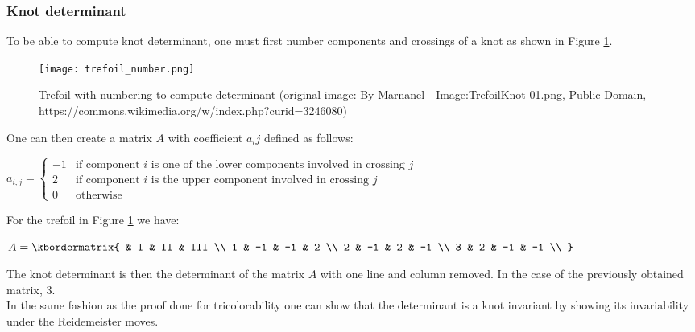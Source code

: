 \documentclass[12pt, a4paper]{article}
\begin{document}
\subsubsection{Knot determinant}
\label{sec:knot_det}

To be able to compute knot determinant, one must first number components and crossings of a knot as shown in Figure \ref{fig:trefoil_number}.

\begin{figure}[H]
  \centering
  \texttt{[image: trefoil\_number.png]}
  \caption{Trefoil with numbering to compute determinant (original image: By Marnanel - Image:TrefoilKnot-01.png, Public Domain, https://commons.wikimedia.org/w/index.php?curid=3246080)}
  \label{fig:trefoil_number}
\end{figure}

One can then create a matrix $A$ with coefficient $a_{i}{j}$ defined as follows:\\

\begin{center}
  $a_{i,j} =
  \begin{cases}
    -1 &\text{if component $i$ is one of the lower components involved in crossing $j$}\\
    2 &\text{if component $i$ is the upper component involved in crossing $j$}\\
    0 &\text{otherwise}
  \end{cases}$
\end{center}

For the trefoil in Figure \ref{fig:trefoil_number} we have:

\begin{center}
$
  A = \kbordermatrix{
    & I & II & III \\
    1 & -1 & -1 & 2  \\
    2 & -1 & 2 & -1  \\
    3 & 2 & -1 & -1  \\
  }
$
\end{center}

The knot determinant is then the determinant of the matrix $A$ with one line and column removed. In the case of the previously obtained matrix, 3.\\

In the same fashion as the proof done for tricolorability one can show that the determinant is a knot invariant by showing its invariability under the Reidemeister moves.\\
\end{document}
